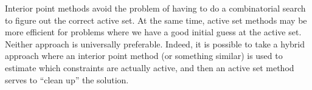 \documentclass[12pt, leqno]{article} %
\begin{document}
Interior point methods avoid the problem of having to do a combinatorial
search to figure out the correct active set. At the same time, active
set methods may be more efficient for problems where we have a good
initial guess at the active set. Neither approach is universally
preferable. Indeed, it is possible to take a hybrid approach where an
interior point method (or something similar) is used to estimate which
constraints are actually active, and then an active set method serves to
``clean up'' the solution.
\end{document}
